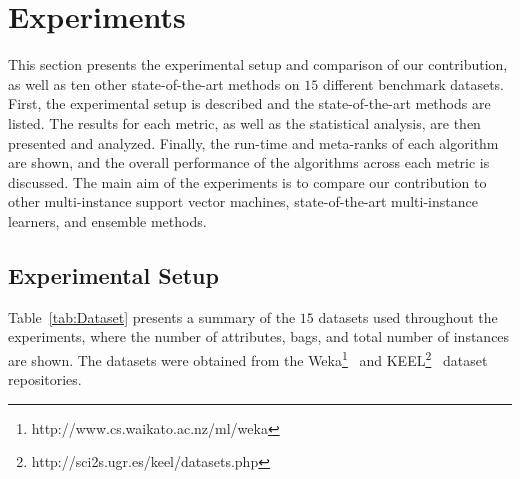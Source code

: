 \section{Experiments}\label{sec:experiments}
This section presents the experimental setup and comparison of our contribution, as well as ten other state-of-the-art methods on $15$ different benchmark datasets. First, the experimental setup is described and the state-of-the-art methods are listed. The results for each metric, as well as the statistical analysis, are then presented and analyzed. Finally, the run-time and meta-ranks of each algorithm are shown, and the overall performance of the algorithms across each metric is discussed. The main aim of the experiments is to compare our contribution to other multi-instance support vector machines, state-of-the-art multi-instance learners, and ensemble methods. 

\subsection{Experimental Setup}
Table~\ref{tab:Dataset} presents a summary of the $15$ datasets used throughout the experiments, where the number of attributes, bags, and total number of instances are shown. The datasets were obtained from the Weka\footnote{http://www.cs.waikato.ac.nz/ml/weka}~\citep{Hall2009} and KEEL\footnote{http://sci2s.ugr.es/keel/datasets.php}~\citep{Alca2011} dataset repositories. 

